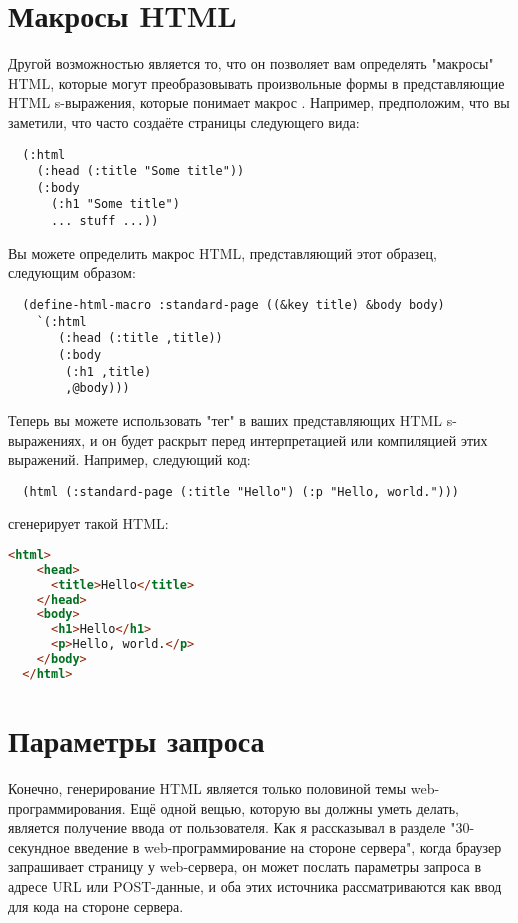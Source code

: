 \section{Макросы HTML}

Другой возможностью  является то, что он позволяет вам определять "макросы"
HTML, которые могут преобразовывать произвольные формы в представляющие HTML s-выражения,
которые понимает макрос . Например, предположим, что вы заметили, что часто
создаёте страницы следующего вида:

\begin{lstlisting}
  (:html
    (:head (:title "Some title"))
    (:body
      (:h1 "Some title")
      ... stuff ...))
\end{lstlisting}

Вы можете определить макрос HTML, представляющий этот образец, следующим образом:

\begin{lstlisting}
  (define-html-macro :standard-page ((&key title) &body body)
    `(:html
       (:head (:title ,title))
       (:body
        (:h1 ,title)
        ,@body)))
\end{lstlisting}

Теперь вы можете использовать "тег"  в ваших представляющих HTML
s-выражениях, и он будет раскрыт перед интерпретацией или компиляцией этих
выражений. Например, следующий код:

\begin{lstlisting}
  (html (:standard-page (:title "Hello") (:p "Hello, world.")))
\end{lstlisting}

сгенерирует такой HTML:

\begin{lstlisting}[language=HTML]
  <html>
    <head>
      <title>Hello</title>
    </head>
    <body>
      <h1>Hello</h1>
      <p>Hello, world.</p>
    </body>
  </html>
\end{lstlisting}

\section{Параметры запроса}

Конечно, генерирование HTML является только половиной темы web-программирования. Ещё одной
вещью, которую вы должны уметь делать, является получение ввода от пользователя. Как я
рассказывал в разделе "30-секундное введение в web-программирование на стороне сервера",
когда браузер запрашивает страницу у web-сервера, он может послать параметры запроса в
адресе URL или POST-данные, и оба этих источника рассматриваются как ввод для кода на
стороне сервера.

